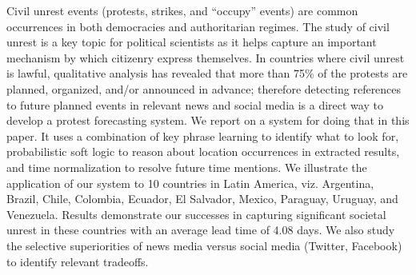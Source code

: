 Civil unrest events (protests, strikes, and ``occupy'' events) are common occurrences in both democracies and authoritarian regimes. The study of civil unrest is a key topic for political scientists as it helps capture an important mechanism by which citizenry express themselves. In countries where civil unrest is lawful, qualitative analysis has revealed that more than 75\% of the protests are planned, organized, and/or announced in advance; therefore detecting references to future planned events in relevant news and social media is a direct way to develop a protest forecasting system. We report on a system for doing that in this paper. It uses a combination of key phrase learning to identify what to look for, probabilistic soft logic to reason about location occurrences in extracted results, and time normalization to resolve future time mentions. We illustrate the application of our system to 10 countries in Latin America, viz. Argentina, Brazil, Chile, Colombia, Ecuador, El Salvador, Mexico, Paraguay, Uruguay, and Venezuela. Results demonstrate our successes in capturing significant societal unrest in these countries with an average lead time of 4.08 days. We also study the selective superiorities of news media versus social media (Twitter, Facebook) to identify relevant tradeoffs.
